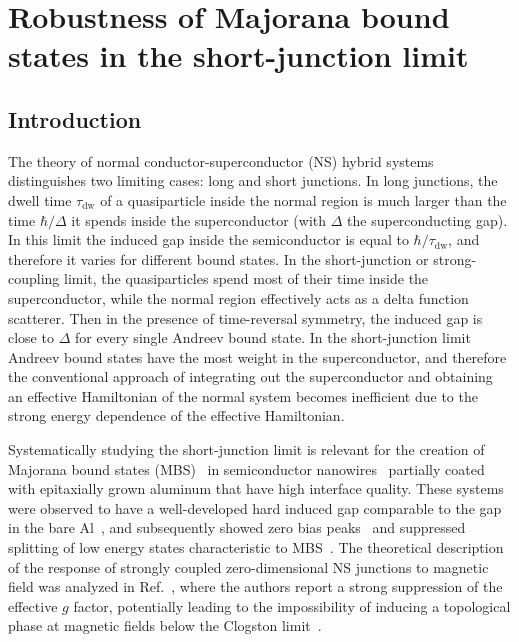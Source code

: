 \chapter{Robustness of Majorana bound states in the short-junction limit}
\label{ch:shortjunction}


\newpage
\noindent

\section{Introduction}
The theory of normal conductor-superconductor (NS) hybrid systems distinguishes two limiting cases: long and short junctions.
In long junctions, the dwell time $\tau_\textrm{dw}$ of a quasiparticle inside the normal region is much larger than the time $\hbar/\Delta$ it spends inside the superconductor (with $\Delta$ the superconducting gap).
In this limit the induced gap inside the semiconductor is equal to $\hbar/\tau_{\textrm{dw}}$, and therefore it varies for different bound states.
In the short-junction or strong-coupling limit, the quasiparticles spend most of their time inside the superconductor, while the normal region effectively acts as a delta function scatterer.
Then in the presence of time-reversal symmetry, the induced gap is close to $\Delta$ for every single Andreev bound state.
In the short-junction limit Andreev bound states have the most weight in the superconductor, and therefore the conventional approach of integrating out the superconductor and obtaining an effective Hamiltonian of the normal system becomes inefficient due to the strong energy dependence of the effective Hamiltonian.

Systematically studying the short-junction limit is relevant for the creation of Majorana bound states (MBS)~\cite{Qi2011, Leijnse2012, Alicea2012, Beenakker2013, Elliott2015} in semiconductor nanowires~\cite{Lutchyn2010, Oreg2010} partially coated with epitaxially grown aluminum that have high interface quality.
These systems were observed to have a well-developed hard induced gap comparable to the gap in the bare Al~\cite{Chang2015}, and subsequently showed zero bias peaks~\cite{Deng2016} and suppressed splitting of low energy states characteristic to MBS~\cite{Albrecht2016}.
The theoretical description of the response of strongly coupled zero-dimensional NS junctions to magnetic field was analyzed in Ref.~\cite{Cole2015}, where the authors report a strong suppression of the effective $g$ factor, potentially leading to the impossibility of inducing a topological phase at magnetic fields below the Clogston limit~\cite{Clogston1962}.

